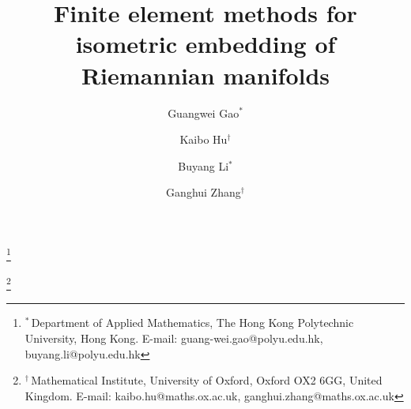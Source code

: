 \documentclass[11pt,a4paper,oneside,reqno]{amsart}
\theoremstyle{definition}
\theoremstyle{plain}
\numberwithin{theorem}{section}
\numberwithin{proposition}{section}
\numberwithin{lemma}{section}
\numberwithin{equation}{section}
\begin{document}

\title[]{Finite element methods for isometric embedding of Riemannian manifolds} 

\author{Guangwei Gao$^*$}
\thanks{$^*$\,Department of Applied Mathematics, The Hong Kong Polytechnic University, Hong Kong.
E-mail: guang-wei.gao@polyu.edu.hk, buyang.li@polyu.edu.hk}

\author{Kaibo Hu$^\dagger$}
\thanks{$^\dagger$\,Mathematical Institute, University of Oxford, Oxford OX2 6GG, United Kingdom.
E-mail: kaibo.hu@maths.ox.ac.uk, ganghui.zhang@maths.ox.ac.uk}

\author{Buyang Li$^*$}

\author{Ganghui Zhang$^\dagger$}

\date{}
\end{document}

